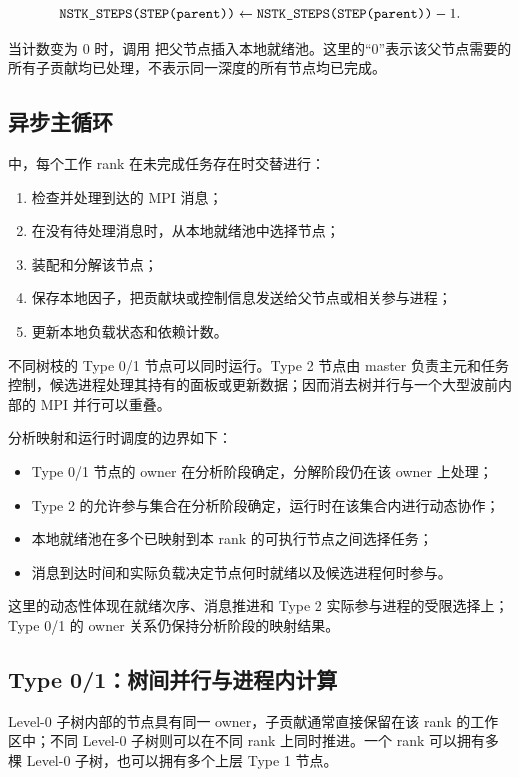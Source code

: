 \[
\texttt{NSTK\_STEPS(STEP(parent))}
\leftarrow
\texttt{NSTK\_STEPS(STEP(parent))}-1.
\]

当计数变为 0 时，调用  把父节点插入本地就绪池。这里的“0”表示该父节点需要的所有子贡献均已处理，不表示同一深度的所有节点均已完成。

\subsection{异步主循环}

 中，每个工作 rank 在未完成任务存在时交替进行：

\begin{enumerate}
  \item 检查并处理到达的 MPI 消息；
  \item 在没有待处理消息时，从本地就绪池中选择节点；
  \item 装配和分解该节点；
  \item 保存本地因子，把贡献块或控制信息发送给父节点或相关参与进程；
  \item 更新本地负载状态和依赖计数。
\end{enumerate}

不同树枝的 Type 0/1 节点可以同时运行。Type 2 节点由 master 负责主元和任务控制，候选进程处理其持有的面板或更新数据；因而消去树并行与一个大型波前内部的 MPI 并行可以重叠。

分析映射和运行时调度的边界如下：

\begin{itemize}
  \item Type 0/1 节点的 owner 在分析阶段确定，分解阶段仍在该 owner 上处理；
  \item Type 2 的允许参与集合在分析阶段确定，运行时在该集合内进行动态协作；
  \item 本地就绪池在多个已映射到本 rank 的可执行节点之间选择任务；
  \item 消息到达时间和实际负载决定节点何时就绪以及候选进程何时参与。
\end{itemize}

这里的动态性体现在就绪次序、消息推进和 Type 2 实际参与进程的受限选择上；Type 0/1 的 owner 关系仍保持分析阶段的映射结果。

\subsection{Type 0/1：树间并行与进程内计算}

Level-0 子树内部的节点具有同一 owner，子贡献通常直接保留在该 rank 的工作区中；不同 Level-0 子树则可以在不同 rank 上同时推进。一个 rank 可以拥有多棵 Level-0 子树，也可以拥有多个上层 Type 1 节点。

